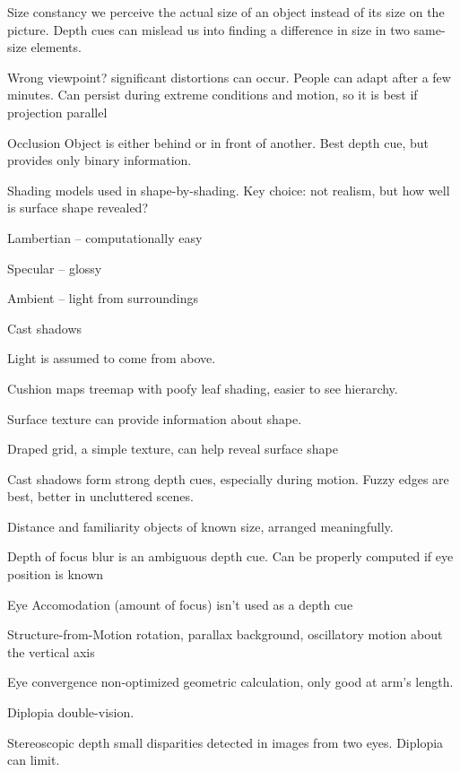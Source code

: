\begin{mdframed}
\begin{multicols}{2}
\begin{compactdesc}

\item[Size constancy] we perceive the actual size of an object instead of its
    size on the picture. Depth cues can mislead us into finding a difference
    in size in two same-size elements.
\item[Wrong viewpoint?] significant distortions can occur. People can adapt
    after a few minutes. Can persist during extreme conditions and motion,
    so it is best if projection parallel
\item[Occlusion] Object is either behind or in front of another. Best depth
    cue, but provides only binary information.
\item[Shading models] used in shape-by-shading. Key choice: not realism, but
    how well is surface shape revealed?
    \begin{compactenum}
    \item Lambertian -- computationally easy
    \item Specular -- glossy
    \item Ambient -- light from surroundings
    \item Cast shadows
    \end{compactenum}
\item[Light is assumed] to come from above.
\item[Cushion maps] treemap with poofy leaf shading, easier to see
    hierarchy.
\item[Surface texture] can provide information about shape.
\item[Draped grid,] a simple texture, can help reveal surface shape
\item[Cast shadows] form strong depth cues, especially during motion. Fuzzy
    edges are best, better in uncluttered scenes.
\item[Distance and familiarity] objects of known size, arranged meaningfully.
\item[Depth of focus] blur is an ambiguous depth cue. Can be properly computed
    if eye position is known
\item[Eye Accomodation] (amount of focus) isn't used as a depth cue
\item[Structure-from-Motion] rotation, parallax background, oscillatory
    motion about the vertical axis
\item[Eye convergence] non-optimized geometric calculation, only good at arm's
    length.
\item[Diplopia] double-vision.
\item[Stereoscopic depth] small disparities detected in images from two eyes.
    Diplopia can limit.
\end{compactdesc}

\end{multicols}\end{mdframed}


